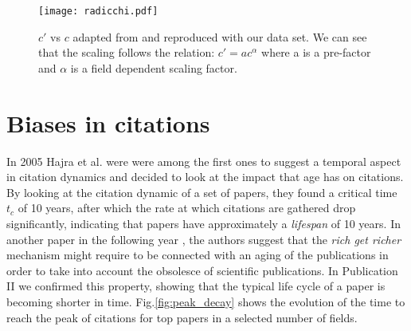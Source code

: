 \begin{figure}[h!]
\centering
\texttt{[image: radicchi.pdf]}%
\caption{$c'$ vs $c$ adapted from \cite{10.1371/journal.pone.0033833} and reproduced with our data set. We can see that the scaling follows the relation: $c' = ac^{\alpha}$ where
a is a pre-factor and $\alpha$ is a field dependent scaling factor.}
\label{fig:radicchi_citations}
\end{figure}

\pagebreak
\newpage


\section{Biases in citations}

In 2005 Hajra et al. were \cite{Hajra200544} were among the first ones to suggest a temporal aspect in citation dynamics and decided to look at the impact that age has on citations. By looking at the citation dynamic of a 
set of papers, they found a critical time $t_{c}$ of 10 years, after which the rate at which citations are gathered drop significantly, indicating that papers have approximately a \textit{lifespan} of 10 years. In another paper in the 
following year \cite{Hajra2006575}, the authors suggest that the \textit{rich get richer} mechanism might require to be connected with an aging of the publications in order to take into account the obsolesce
of scientific publications. In Publication II we confirmed this property, showing that the typical life cycle of a paper is becoming shorter in time. Fig.\ref{fig:peak_decay} shows the evolution of the time to reach the 
peak of citations for top papers in a selected number of fields.
